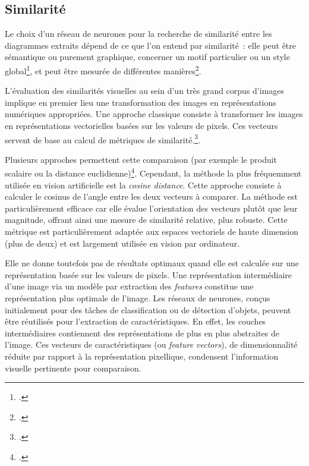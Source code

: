 \hypertarget{similarite}{%
\subsection{Similarité}\label{similarite}}

Le choix d'un réseau de neurones pour la recherche de similarité entre
les diagrammes extraits dépend de ce que l'on entend par similarité~:
elle peut être sémantique ou purement graphique, concerner un motif
particulier ou un style global\footcite[``Quelle similarité chercher~?
  De multiples échelles sont possibles~: celle du document
  (reproductions, duplicatas)~; celle de l'objet (reconnaissance d'un
  élément récurrent)~; celle du « style »~; ou même celle du motif
  (orientation d'un bras, position d'un corps, type de mise en
  page,\ldots)''][p.3]{champenois_visual_2023}, et peut
être mesurée de différentes manières\footcite{di_leonardo_visual_2016}.

L'évaluation des similarités visuelles au sein d'un très grand corpus
d'images implique en premier lieu une transformation des images en
représentations numériques appropriées. Une approche classique consiste à
transformer les images en représentations vectorielles basées sur les valeurs de pixels. Ces
vecteurs servent de base au calcul de métriques de
similarité.\footcite[Les explications qui suivent s'inspirent de la
  présentation donnée par Ségolène Albouy lors de la conférence ][]{noauthor_eida_nodate}.

Plusieurs approches permettent cette comparaison (par exemple le produit
scalaire ou la distance euclidienne)\footcite{gronne_introduction_2022}. Cependant,
la méthode la plus fréquemment utilisée en vision artificielle est la
\emph{cosine distance}. Cette approche consiste à calculer le cosinus de
l'angle entre les deux vecteurs à comparer. La méthode est
particulièrement efficace car elle évalue l'orientation des vecteurs
plutôt que leur magnitude, offrant ainsi une mesure de similarité
relative, plus robuste. Cette métrique est particulièrement adaptée aux
espaces vectoriels de haute dimension (plus de deux) et est largement
utilisée en vision par ordinateur.

Elle ne donne toutefois pas de résultats optimaux quand elle est
calculée sur une représentation basée sur les valeurs de pixels. Une
représentation intermédiaire d'une image via un modèle par extraction
des \emph{features} constitue une représentation plus optimale de
l'image. Les réseaux de neurones, conçus initialement pour des tâches de
classification ou de détection d'objets, peuvent être réutilisés pour
l'extraction de caractéristiques. En effet, les couches intermédiaires
contiennent des représentations de plus en plus abstraites de l'image.
Ces vecteurs de caractéristiques (ou \emph{feature vectors}), de
dimensionnalité réduite par rapport à la représentation pixellique,
condensent l'information visuelle pertinente pour comparaison.

